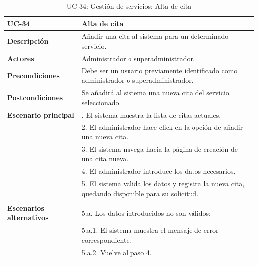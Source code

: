 \begin{table}[H]
  \begin{center}
    \begin{tabularx}{16.4cm}{|l|X|}
      \hline
      \textbf{UC-34} & \textbf{Alta de cita}\\
      \hline
      \textbf{Descripción} & Añadir una cita al sistema para un determinado servicio.\\
      \hline
      \textbf{Actores} & Administrador o superadministrador.\\
      \hline
      \textbf{Precondiciones} & Debe ser un usuario previamente identificado como administrador o superadministrador.\\
      \hline
      \textbf{Postcondiciones} & Se añadirá al sistema una nueva cita del servicio seleccionado.\\
      \hline
      \textbf{Escenario principal} & \smallskip 1. El sistema muestra la lista de citas actuales.\\
      & 2. El administrador hace click en la opción de añadir una nueva cita.\\
      & 3. El sistema navega hacia la página de creación de una cita nueva.\\
      & 4. El administrador introduce los datos necesarios.\\
      & 5. El sistema valida los datos y registra la nueva cita, quedando disponible para su solicitud.\\
      & \\
      \hline
      \textbf{Escenarios alternativos} & \smallskip 5.a. Los datos introducidos no son válidos:\\
      & \hspace{0.3cm} 5.a.1. El sistema muestra el mensaje de error correspondiente.\\
      & \hspace{0.3cm} 5.a.2. Vuelve al paso 4.\\
      & \\
      \hline
    \end{tabularx}
    \caption{UC-34: Gestión de servicios: Alta de cita}
    \label{tab:CU-alta-cita}
  \end{center}
\end{table}


